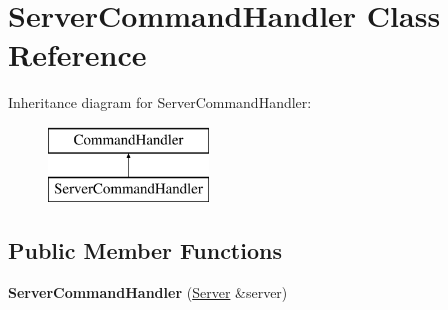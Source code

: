\hypertarget{class_server_command_handler}{\section{Server\-Command\-Handler Class Reference}
\label{class_server_command_handler}
}
Inheritance diagram for Server\-Command\-Handler\-:\begin{figure}[H]
\begin{center}
\leavevmode
\includegraphics[height=2.000000cm]{class_server_command_handler}
\end{center}
\end{figure}
\subsection*{Public Member Functions}
\begin{DoxyCompactItemize}
\item 
\hypertarget{class_server_command_handler_a9ca785453aa82ddc41ae8ed4c84c8aba}{{\bfseries Server\-Command\-Handler} (\hyperlink{class_server}{Server} \&server)}\label{class_server_command_handler_a9ca785453aa82ddc41ae8ed4c84c8aba}

\end{DoxyCompactItemize}
